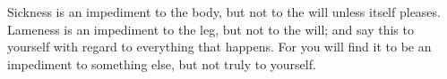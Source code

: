 Sickness  is an  impediment to  the body,  but not  to the  will unless  itself
pleases. Lameness  is an impediment to  the leg, but  not to the will;  and say
this to yourself with  regard to everything that happens. For  you will find it
to be an impediment to something else, but not truly to yourself.
